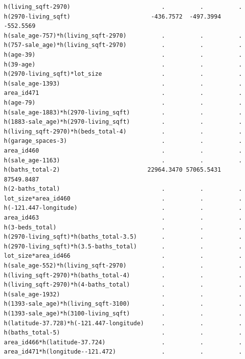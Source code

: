 \documentclass[
]{article}
\begin{document}
\begin{verbatim}
h(living_sqft-2970)                          .          .          .     
h(2970-living_sqft)                       -436.7572  -497.3994  -552.5569
h(sale_age-757)*h(living_sqft-2970)          .          .          .     
h(757-sale_age)*h(living_sqft-2970)          .          .          .     
h(age-39)                                    .          .          .     
h(39-age)                                    .          .          .     
h(2970-living_sqft)*lot_size                 .          .          .     
h(sale_age-1393)                             .          .          .     
area_id471                                   .          .          .     
h(age-79)                                    .          .          .     
h(sale_age-1883)*h(2970-living_sqft)         .          .          .     
h(1883-sale_age)*h(2970-living_sqft)         .          .          .     
h(living_sqft-2970)*h(beds_total-4)          .          .          .     
h(garage_spaces-3)                           .          .          .     
area_id460                                   .          .          .     
h(sale_age-1163)                             .          .          .     
h(baths_total-2)                         22964.3470 57065.5431 87549.8487
h(2-baths_total)                             .          .          .     
lot_size*area_id460                          .          .          .     
h(-121.447-longitude)                        .          .          .     
area_id463                                   .          .          .     
h(3-beds_total)                              .          .          .     
h(2970-living_sqft)*h(baths_total-3.5)       .          .          .     
h(2970-living_sqft)*h(3.5-baths_total)       .          .          .     
lot_size*area_id466                          .          .          .     
h(sale_age-552)*h(living_sqft-2970)          .          .          .     
h(living_sqft-2970)*h(baths_total-4)         .          .          .     
h(living_sqft-2970)*h(4-baths_total)         .          .          .     
h(sale_age-1932)                             .          .          .     
h(1393-sale_age)*h(living_sqft-3100)         .          .          .     
h(1393-sale_age)*h(3100-living_sqft)         .          .          .     
h(latitude-37.728)*h(-121.447-longitude)     .          .          .     
h(baths_total-5)                             .          .          .     
area_id466*h(latitude-37.724)                .          .          .     
area_id471*h(longitude--121.472)             .          .          .     
                                                                  

\end{verbatim}
\end{document}
